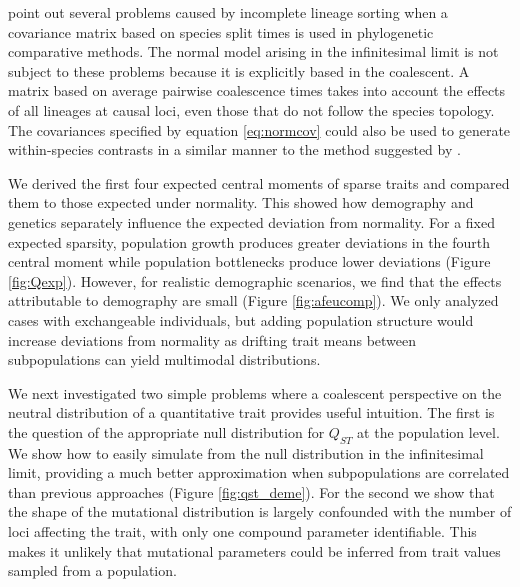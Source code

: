 \citet{Mendes2018} point out several problems caused by incomplete
lineage sorting when a covariance matrix based on species split times is used in
phylogenetic comparative methods. The normal model arising in the infinitesimal
limit is not subject to these problems because it is explicitly based in the
coalescent. A matrix based on average pairwise coalescence times takes into
account the effects of all lineages at causal loci, even those that do not
follow the species topology. The covariances specified by
equation \eqref{eq:normcov} could also be used to generate within-species
contrasts in a similar manner to the method suggested
by \citet{Felsenstein2002}.

We derived the first four expected central moments of sparse traits and compared
them to those expected under normality. This showed how demography and genetics
separately influence the expected deviation from normality. For a fixed expected
sparsity, population growth produces greater deviations in the fourth central
moment while population bottlenecks produce lower deviations (Figure
\ref{fig:Qexp}). However, for realistic demographic scenarios,
we find that the effects attributable to demography are small (Figure
\ref{fig:afeucomp}). We only analyzed cases with exchangeable individuals,
but adding population structure would increase deviations from normality as
drifting trait means between subpopulations can yield multimodal distributions.

We next investigated two simple problems where a coalescent perspective on the
neutral distribution of a quantitative trait provides useful intuition. The
first is the question of the appropriate null distribution for $Q_{ST}$ at the
population level. We show how to easily simulate from the null distribution in
the infinitesimal limit, providing a much better approximation when
subpopulations are correlated than previous approaches \citep{Whitlock2009}
(Figure \ref{fig:qst_deme}). For the second we show that the shape of the
mutational distribution is largely confounded with the number of loci affecting
the trait, with only one compound parameter identifiable. This makes it unlikely
that mutational parameters could be inferred from trait values sampled from a
population.

